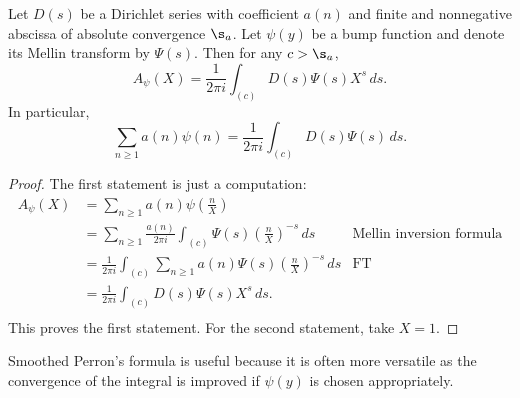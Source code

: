     \begin{theorem}
      Let $D(s)$ be a Dirichlet series with coefficient $a(n)$ and finite and nonnegative abscissa of absolute convergence $\s_{a}$. Let $\psi(y)$ be a bump function and denote its Mellin transform by $\Psi(s)$. Then for any $c > \s_{a}$,
      \[
        A_{\psi}(X) = \frac{1}{2\pi i}\int_{(c)}D(s)\Psi(s)X^{s}\,ds.
      \]
      In particular,
      \[
        \sum_{n \ge 1}a(n)\psi(n) = \frac{1}{2\pi i}\int_{(c)}D(s)\Psi(s)\,ds.
      \]
    \end{theorem}
    \begin{proof}
      The first statement is just a computation:
      \begin{align*}
        A_{\psi}(X) &= \sum_{n \ge 1}a(n)\psi\left(\frac{n}{X}\right) \\
        &= \sum_{n \ge 1}\frac{a(n)}{2\pi i}\int_{(c)}\Psi(s)\left(\frac{n}{X}\right)^{-s}\,ds & \text{Mellin inversion formula} \\
        &= \frac{1}{2\pi i}\int_{(c)}\sum_{n \ge 1}a(n)\Psi(s)\left(\frac{n}{X}\right)^{-s}\,ds & \text{FT} \\
        &= \frac{1}{2\pi i}\int_{(c)}D(s)\Psi(s)X^{s}\,ds. \\
      \end{align*}
      This proves the first statement. For the second statement, take $X = 1$.
    \end{proof}

    Smoothed Perron's formula is useful because it is often more versatile as the convergence of the integral is improved if $\psi(y)$ is chosen appropriately.
